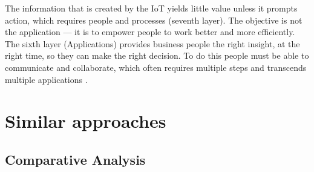 
The information that is created by the \acs{IoT} yields little value unless it prompts action, which requires people and processes (seventh layer). The objective is not the application — it is to empower people to work better and more efficiently. The sixth layer (Applications) provides business people the right insight, at the right time, so they can make the right decision. To do this people must be able to communicate and collaborate, which often requires multiple steps and transcends multiple applications \cite{Cisco2014}.

\section{Similar approaches}
\label{sec:sim-approaches}


\subsection{Comparative Analysis}

